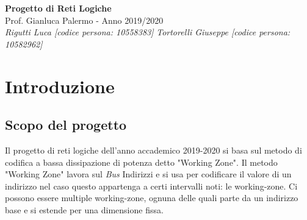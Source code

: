 \documentclass{article}
\begin{document}
\begin{titlepage}
   \begin{center}
      \Huge\textbf{Progetto di Reti Logiche}\\
      \vspace{5mm} %
      \Large Prof. Gianluca Palermo - Anno 2019/2020\\
      \vspace{5mm} %
      \large\textit{Rigutti Luca [codice persona: 10558383]}
      \linebreak
      \large\textit{Tortorelli Giuseppe [codice persona: 10582962]}
   \end{center}
\end{titlepage}
\printindex

\tableofcontents
\pagebreak

\section{Introduzione}
\subsection{Scopo del progetto}
Il progetto di reti logiche dell'anno accademico 2019-2020 si basa sul metodo di codifica a bassa dissipazione di potenza detto "Working Zone".
Il metodo "Working Zone" lavora sul \textit{Bus} Indirizzi e si usa per codificare il valore di un indirizzo nel caso questo appartenga a certi intervalli noti: le working-zone. Ci possono essere multiple working-zone, ognuna delle quali parte da un indirizzo base e si estende per una dimensione fissa.
\end{document}
